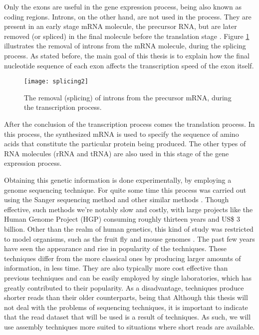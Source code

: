 Only the exons are useful in the gene expression process, being also known as
coding regions. Introns, on the other hand, are not used in the process. They
are present in an early stage mRNA molecule, the precursor RNA, but are later
removed (or spliced) in the final molecule before the translation stage
\cite{leic:gene_expr}. Figure \ref{fig:splicing} illustrates the removal of
introns from the mRNA molecule, during the  splicing process. As stated before,
the main goal of this thesis is to explain how the final nucleotide sequence of
each exon affects the transcription speed of the exon itself.

\begin{figure}[!htb]
  \begin{center}
    \leavevmode
    \texttt{[image: splicing2]}
    \caption[Removal of introns from precursor mRNA]{The removal (splicing) of
    introns from the precursor mRNA, during the transcription process.}
    \label{fig:splicing}
  \end{center}
\end{figure}

After the conclusion of the transcription process comes the translation process.
In this process, the synthesized mRNA is used to specify the sequence of amino
acids that constitute the particular protein being produced. The other types of
RNA molecules (rRNA and tRNA) are also used in this stage of the gene expression
process.

Obtaining this genetic information is done experimentally, by employing a genome
sequencing technique. For quite some time this process was carried out using the
Sanger sequencing method and other similar methods \cite{Reis-Filho2009}. Though
effective, such methods we're notably slow and costly, with large projects like
the Human Genome Project (HGP) consuming roughly thirteen years and US\$ 3
billion. Other than the realm of human genetics, this kind of study was
restricted to model organisms, such as the fruit fly and mouse genomes
\cite{Wolf2013}. The past few years have seen the appearance and rise in
popularity of the \ngs{} techniques. These techniques differ from the more
classical ones by producing larger amounts of information, in less time. They
are also typically more cost effective than previous techniques and can be
easily employed by single laboratories, which has greatly contributed to their
popularity. As a disadvantage, \ngs{} techniques produce shorter reads than
their older counterparts, being that 
\cite[p. 671]{Martin2011} Although this thesis will not deal with the problems
of sequencing techniques, it is important to indicate that the read dataset that
will be used is a result of \ngs{} techniques. As such, we will use assembly
techniques more suited to situations where short reads are available.

